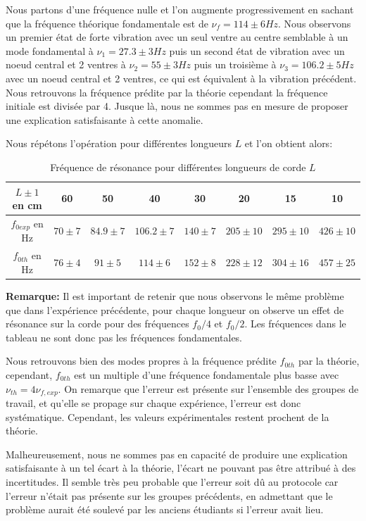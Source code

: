 \documentclass[12pt]{article}
\begin{document}
Nous partons d'une fréquence nulle et l'on augmente progressivement en sachant que la fréquence théorique fondamentale est de $\nu_f = 114 \pm 6 Hz$.
Nous observons un premier état de forte vibration avec un seul ventre au centre semblable à un mode fondamental à $\nu_1 = 27.3 \pm 3 Hz$ puis un second état 
de vibration avec un noeud central et 2 ventres à $\nu_2 = 55 \pm 3 Hz$ puis un troisième à $\nu_3 = 106.2 \pm 5Hz$ avec un noeud central et 2 ventres, ce qui est équivalent à la vibration
précédent. Nous retrouvons la fréquence prédite par la théorie cependant la fréquence initiale est divisée par 4. Jusque là, nous ne sommes pas en mesure de proposer une explication
satisfaisante à cette anomalie.

Nous répétons l'opération pour différentes longueurs $L$ et l'on obtient alors:

\begin{table}[h!]
	\centering
	\begin{tabular}{||c c c c c c c c||} 
		\hline
		$L \pm 1$ en cm & 60 & 50 & 40 & 30 & 20 & 15 & 10 \\
		\hline
        $f_{0exp}$ en Hz & $70 \pm 7$ & $84.9 \pm 7$ & $106.2 \pm 7$ & $140 \pm 7$ & $205 \pm 10$ & $295 \pm 10$ & $426 \pm 10$ \\
        $f_{0th}$ en Hz & $76 \pm 4$ & $91 \pm 5$ & $114 \pm 6$ & $152 \pm 8$ & $228 \pm 12$ & $304 \pm 16$ & $457 \pm 25$ \\
		\hline
	\end{tabular}
	\caption{Fréquence de résonance pour différentes longueurs de corde $L$}
	\label{table:2}
\end{table}

\textbf{Remarque:} Il est important de retenir que nous observons le même problème que dans l'expérience précédente, pour chaque longueur on observe un effet de résonance sur la corde
pour des fréquences $f_0/4$ et $f_0 / 2$. Les fréquences dans le tableau ne sont donc pas les fréquences fondamentales.

Nous retrouvons bien des modes propres à la fréquence prédite $f_{0th}$ par la théorie, cependant, $f_{0th}$ est un multiple d'une fréquence fondamentale plus basse avec $\nu_{th} = 4 \nu_{f,exp}$.
On remarque que l'erreur est présente sur l'ensemble des groupes de travail, et qu'elle se propage sur chaque expérience, l'erreur est donc systématique. Cependant, les valeurs expérimentales restent prochent
de la théorie.

Malheureusement, nous ne sommes pas en capacité de produire une explication satisfaisante à un tel écart à la théorie, l'écart ne pouvant pas être attribué à des incertitudes. Il semble très peu probable
que l'erreur soit dû au protocole car l'erreur n'était pas présente sur les groupes précédents, en admettant que le problème aurait été soulevé par les anciens étudiants si l'erreur avait lieu.
\end{document}
